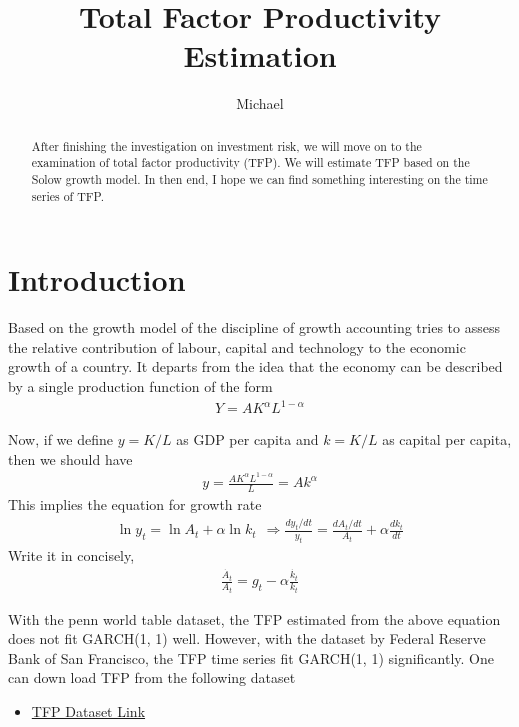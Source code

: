 \documentclass[12pt]{article}
\theoremstyle{definition}
\numberwithin{equation}{section}
\numberwithin{figure}{section}
\numberwithin{table}{section}
\begin{document}
\title{Total Factor Productivity Estimation}
\author{Michael}
\date{}
\maketitle

\begin{abstract}
  After finishing the investigation on investment risk, we will move on to the examination of total factor productivity (TFP). We will estimate TFP based on the Solow growth model. In then end, I hope we can find something interesting on the time series of TFP.
\end{abstract}


\section{Introduction}

Based on the growth model of \cite{solow1956contribution} the discipline of growth accounting tries to assess the relative contribution of labour, capital and technology to the economic growth of a country. It departs from the idea that the economy can be described by a single production function of the form
\begin{align}
  Y = A K^\alpha L^{1-\alpha}
\end{align}

Now, if we define $y = K/L$ as GDP per capita and $k = K/L$ as capital per capita, then we should have
\begin{align}
  y = \frac{AK^\alpha L^{1-\alpha}}{L} = A k^\alpha
\end{align}
This implies the equation for growth rate
\begin{align}
  \ln y_t = \ln A_t + \alpha \ln k_t \ \ \Rightarrow \frac{dy_t/ dt}{y_t} = \frac{dA_t /dt}{A_t} + \alpha \frac{dk_t}{dt}
\end{align}
Write it in concisely,
\begin{align}
  \frac{\dot{A_t}}{A_t} = g_t - \alpha \frac{\dot{k_t}}{k_t}
\end{align}

With the penn world table dataset, the TFP estimated from the above equation does not fit GARCH(1, 1) well. However, with the dataset by Federal Reserve Bank of San Francisco, the TFP time series fit GARCH(1, 1) significantly. One can down load TFP from the following dataset
\begin{itemize}
  \item \href{https://www.frbsf.org/economic-research/indicators-data/total-factor-productivity-tfp/}{TFP Dataset Link}
\end{itemize}



\newpage


\end{document}
